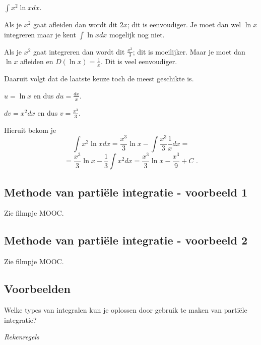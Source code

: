 \begin{voorbeeld}
	$\int x^2 \ln x dx$.

Als  je $x^2$ gaat afleiden dan wordt dit $2x$; dit is eenvoudiger. 
Je moet dan wel $\ln x$ integreren maar je kent $\int \ln x dx$ mogelijk nog niet.

Als je $x^2$ gaat integreren dan wordt dit $\frac{x^3}{3}$; dit is moeilijker.
Maar je moet dan $\ln x$ afleiden en $D (\ln x) = \frac{1}{x}$.
Dit is veel eenvoudiger.

Daaruit volgt dat de laatste keuze toch de meest geschikte is.

$u=\ln x$ en dus $du=\frac{dx}{x}$.

$dv=x^2dx$ en dus $v=\frac{x^3}{3}$.

Hieruit bekom je
\[
\int x^2 \ln x dx=\frac{x^3}{3} \ln x-\int \frac{x^3}{3}\frac{1}{x}dx=
\]
\[
=\frac{x^3}{3} \ln x-\frac{1}{3} \int x^2 dx=\frac{x^3}{3} \ln x -\frac{x^3}{9}+C \text { .}
\]

\end{voorbeeld}

\subsection{Methode van parti\"ele integratie - voorbeeld 1}
Zie filmpje MOOC.

\subsection{Methode van parti\"ele integratie - voorbeeld 2}
Zie filmpje MOOC.

\subsection{Voorbeelden}

Welke types van integralen kun je oplossen door gebruik te maken van parti\"ele integratie?

\emph{Rekenregels}


